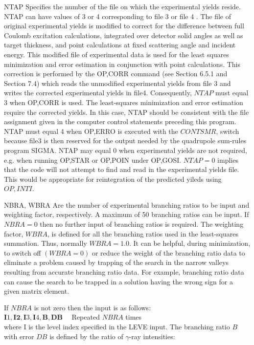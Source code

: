 \documentclass[10pt]{article}
\begin{document}
NTAP Specifies the number of the file on which the experimental yields reside. NTAP can have values of 3 or 4 corresponding to file 3 or file 4 . The file of original experimental yields is modified to correct for the difference between full Coulomb excitation calculations, integrated over detector solid angles as well as target thickness, and point calculations at fixed scattering angle and incident energy. This modified file of experimental data is used for the least squares minimization and error estimation in conjunction with point calculations. This correction is performed by the OP,CORR command (see Section 6.5.1 and Section 7.4) which reads the unmodified experimental yields from file 3 and writes the corrected experimental yields in file4. Consequently, $N T A P$ must equal 3 when OP,CORR is used. The least-squares minimization and error estimation require the corrected yields. In this case, NTAP should be consistent with the file assignment given in the computer control statements preceding this program. NTAP must equal 4 when OP,ERRO is executed with the $C O N T S M R$, switch because file3 is then reserved for the output needed by the quadrupole sum-rules program SIGMA. NTAP may equal 0 when experimental yields are not required, e.g. when running OP,STAR or OP,POIN under OP,GOSI. $N T A P=0$ implies that the code will not attempt to find and read in the experimental yields file. This would be appropriate for reintegration of the predicted yileds using $O P, I N T I$.

NBRA, WBRA Are the number of experimental branching ratios to be input and weighting factor, respectively. A maximum of 50 branching ratios can be input. If $N B R A=0$ then no further input of branching ratios is required. The weighting factor, $W B R A$, is defined for all the branching ratios used in the least-squares summation. Thus, normally $W B R A=1.0$. It can be helpful, during minimization, to switch off $(W B R A=0)$ or reduce the weight of the branching ratio data to eliminate a problem caused by trapping of the search in the narrow valleys resulting from accurate branching ratio data. For example, branching ratio data can cause the search to be trapped in a solution having the wrong sign for a given matrix element.

If $N B R A$ is not zero then the input is as follows:\\
$\mathbf{I} 1, \mathbf{I 2}, \mathbf{I} 3, \mathbf{I} 4, \mathbf{B}, \mathbf{D B} \quad$ Repeated $N B R A$ times\\
where I is the level index specified in the LEVE input. The branching ratio $B$ with error $D B$ is defined by the ratio of $\gamma$-ray intensities:
\end{document}
